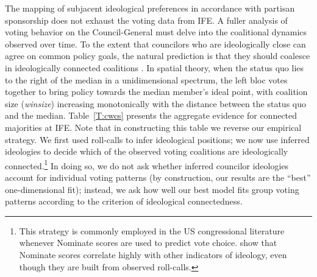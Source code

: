 \documentclass[12 pt, letter]{article}
\begin{document}
The mapping of subjacent ideological preferences in accordance with partisan sponsorship does not exhaust the voting data from IFE.
A fuller analysis of voting behavior on the Council-General must delve into the coalitional dynamics observed over time.  To the extent that councilors who are ideologically close can agree on common policy goals, the natural prediction is that they should coalesce in ideologically connected coalitions \citep{Axelrod1970}.  In spatial theory, when the status quo lies to the right of the median in a unidimensional spectrum, the left bloc votes together to bring policy towards the median member's ideal point, with coalition size (\emph{winsize}) increasing monotonically with the distance between the status quo and the median.  Table~\ref{T:cwcs} presents the aggregate evidence for connected majorities at IFE.  Note that in constructing this table we reverse our empirical strategy.  We first used roll-calls to infer ideological positions; we now use inferred ideologies to decide which of the observed voting coalitions are ideologically connected.\footnote{This strategy is commonly employed in the US congressional literature whenever {\sc Nominate} scores are used to predict vote choice.  \citet{Burden2000} show that {\sc Nominate} scores correlate highly with other indicators of ideology, even though they are built from observed roll-calls.}  In doing so, we do not ask whether inferred councilor ideologies account for individual voting patterns (by construction, our results are the ``best'' one-dimensional fit); instead, we ask how well our best model fits group voting patterns according to the criterion of ideological connectedness.
\end{document}
